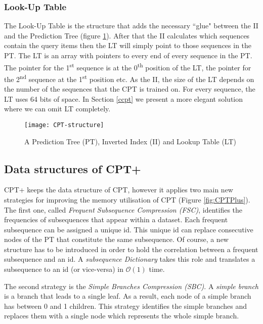 \subsubsection*{Look-Up Table}
The Look-Up Table is the structure that adds the necessary ``glue" between the II and the Prediction Tree (figure \ref{fig:CPT-structure}). After that the II calculates which sequences contain the query items then the LT will simply point to those sequences in the PT. The LT is an array with pointers to every end of every sequence in the PT. The pointer for the 1\textsuperscript{st} sequence is at the 0\textsuperscript{th} position of the LT, the pointer for the 2\textsuperscript{nd} sequence at the 1\textsuperscript{st} position etc. As the II, the size of the LT depends on the number of the sequences that the CPT is trained on. For every sequence, the LT uses 64 bits of space. In Section \ref{ccpt} we present a more elegant solution where we can omit LT completely.

\begin{figure}[h]
    \centering
    \texttt{[image: CPT-structure]}
    \caption{A Prediction Tree (PT), Inverted Index (II) and Lookup Table (LT)}
    \label{fig:CPT-structure}
\end{figure}

\subsection{Data structures of CPT+}
CPT+ keeps the data structure of CPT, however it applies two main new strategies for improving the memory utilisation of CPT \cite{gueniche_fournier-viger_raman_tseng_2015} (Figure \ref{fig:CPTPlus}). The first one, called \emph{Frequent Subsequence Compression (FSC)}, identifies the frequencies of subsequences that appear within a dataset. Each frequent subsequence can be assigned a unique id. This unique id can replace consecutive nodes of the PT that constitute the same subsequence. Of course, a new structure has to be introduced in order to hold the correlation between a frequent subsequence and an id. A \emph{subsequence Dictionary} takes this role and translates a subsequence to an id (or vice-versa) in \(\mathcal{O}(1)\) time. 
\par The second strategy is the \emph{Simple Branches Compression (SBC)}. A \emph{simple branch} is a branch that leads to a single leaf. As a result, each node of a simple branch has between 0 and 1 children. This strategy identifies the simple branches and replaces them with a single node which represents the whole simple branch.

